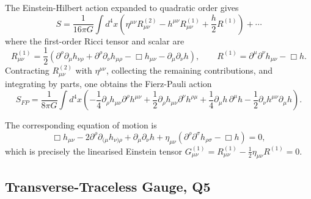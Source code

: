 \begin{solution}
The Einstein-Hilbert action expanded to quadratic order gives
\begin{equation}
    S = \frac{1}{16\pi G}\int d^4x\left(\eta^{\mu\nu}R^{(2)}_{\mu\nu}-h^{\mu\nu}R^{(1)}_{\mu\nu}+\frac{h}{2}R^{(1)}\right)+\cdots
\end{equation}
where the first-order Ricci tensor and scalar are
\begin{equation}
    R^{(1)}_{\mu\nu} = \frac{1}{2}\left(\partial^\rho\partial_\mu h_{\nu\rho}+\partial^\rho\partial_\nu h_{\mu\rho}-\Box h_{\mu\nu}-\partial_\mu\partial_\nu h\right), \qquad R^{(1)} = \partial^\mu\partial^\nu h_{\mu\nu}-\Box h.
\end{equation}
Contracting $R^{(2)}_{\mu\nu}$ with $\eta^{\mu\nu}$, collecting the remaining contributions, and integrating by parts, one obtains the Fierz-Pauli action
\begin{equation}
    S_{FP} = \frac{1}{8\pi G}\int d^4x\left(-\frac{1}{4}\partial_\rho h_{\mu\nu}\partial^\rho h^{\mu\nu}+\frac{1}{2}\partial_\rho h_{\mu\nu}\partial^\nu h^{\rho\mu}+\frac{1}{4}\partial_\mu h\,\partial^\mu h-\frac{1}{2}\partial_\nu h^{\mu\nu}\partial_\mu h\right).
\end{equation}

The corresponding equation of motion is
\begin{equation}
    \Box h_{\mu\nu}-2\partial^\rho\partial_{(\mu}h_{\nu)\rho}+\partial_\mu\partial_\nu h+\eta_{\mu\nu}\left(\partial^\rho\partial^\sigma h_{\rho\sigma}-\Box h\right)=0,
\end{equation}
which is precisely the linearised Einstein tensor $G^{(1)}_{\mu\nu}=R^{(1)}_{\mu\nu}-\frac{1}{2}\eta_{\mu\nu}R^{(1)}=0$. 

\end{solution}

\subsection{Transverse-Traceless Gauge, Q5}

